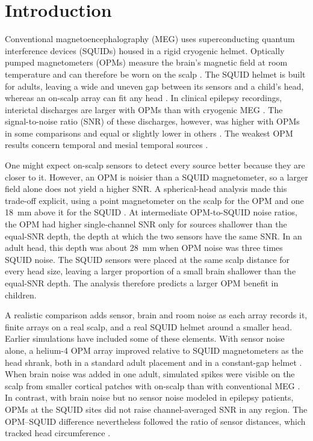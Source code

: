 \documentclass[preprint,12pt,authoryear,a4paper]{elsarticle}
\begin{document}
\linenumbers

\section{Introduction}\label{sec:intro}

Conventional magnetoencephalography (MEG) uses superconducting quantum interference devices (SQUIDs) housed in a rigid cryogenic helmet. Optically pumped magnetometers (OPMs) measure the brain's magnetic field at room temperature and can therefore be worn on the scalp \citep{boto2017,iivanainen2017}. The SQUID helmet is built for adults, leaving a wide and uneven gap between its sensors and a child's head, whereas an on-scalp array can fit any head \citep{feysdetiege2024,hill2019}. In clinical epilepsy recordings, interictal discharges are larger with OPMs than with cryogenic MEG \citep{feys2022,ren2025}. The signal-to-noise ratio (SNR) of these discharges, however, was higher with OPMs in some comparisons \citep{feys2022,feys2025,ren2025} and equal or slightly lower in others \citep{hillebrand2023,schwartz2025}. The weakest OPM results concern temporal and mesial temporal sources \citep{feys2024,feys2025,shen2026}.

One might expect on-scalp sensors to detect every source better because they are closer to it. However, an OPM is noisier than a SQUID magnetometer, so a larger field alone does not yield a higher SNR. A spherical-head analysis made this trade-off explicit, using a point magnetometer on the scalp for the OPM and one 18~mm above it for the SQUID \citep{jas2026}. At intermediate OPM-to-SQUID noise ratios, the OPM had higher single-channel SNR only for sources shallower than the equal-SNR depth, the depth at which the two sensors have the same SNR. In an adult head, this depth was about 28~mm when OPM noise was three times SQUID noise. The SQUID sensors were placed at the same scalp distance for every head size, leaving a larger proportion of a small brain shallower than the equal-SNR depth. The analysis therefore predicts a larger OPM benefit in children.

A realistic comparison adds sensor, brain and room noise as each array records it, finite arrays on a real scalp, and a real SQUID helmet around a smaller head. Earlier simulations have included some of these elements. With sensor noise alone, a helium-4 OPM array improved relative to SQUID magnetometers as the head shrank, both in a standard adult placement and in a constant-gap helmet \citep{zahran2022}. When brain noise was added in one adult, simulated spikes were visible on the scalp from smaller cortical patches with on-scalp than with conventional MEG \citep{westin2023}. In contrast, with brain noise but no sensor noise modeled in epilepsy patients, OPMs at the SQUID sites did not raise channel-averaged SNR in any region. The OPM--SQUID difference nevertheless followed the ratio of sensor distances, which tracked head circumference \citep{matsubara2026}.
\end{document}
